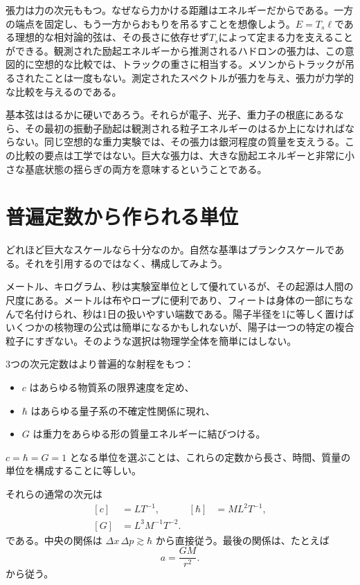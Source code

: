 張力は力の次元ももつ。なぜなら力かける距離はエネルギーだからである。一方の端点を固定し、もう一方からおもりを吊るすことを想像しよう。\(E=T_s\ell\)である理想的な相対論的弦は、その長さに依存せず\(T_s\)によって定まる力を支えることができる。観測された励起エネルギーから推測されるハドロンの張力は、この意図的に空想的な比較では、トラックの重さに相当する。メソンからトラックが吊るされたことは一度もない。測定されたスペクトルが張力を与え、張力が力学的な比較を与えるのである。

基本弦ははるかに硬いであろう。それらが電子、光子、重力子の根底にあるなら、その最初の振動子励起は観測される粒子エネルギーのはるか上になければならない。同じ空想的な重力実験では、その張力は銀河程度の質量を支えうる。この比較の要点は工学ではない。巨大な張力は、大きな励起エネルギーと非常に小さな基底状態の揺らぎの両方を意味するということである。

\section{普遍定数から作られる単位}

どれほど巨大なスケールなら十分なのか。自然な基準はプランクスケールである。それを引用するのではなく、構成してみよう。

メートル、キログラム、秒は実験室単位として優れているが、その起源は人間の尺度にある。メートルは布やロープに便利であり、フィートは身体の一部にちなんで名付けられ、秒は1日の扱いやすい端数である。陽子半径を1に等しく置けばいくつかの核物理の公式は簡単になるかもしれないが、陽子は一つの特定の複合粒子にすぎない。そのような選択は物理学全体を簡単にはしない。

3つの次元定数はより普遍的な射程をもつ：
\begin{itemize}
  \item \(c\) はあらゆる物質系の限界速度を定め、
  \item \(\hbar\) はあらゆる量子系の不確定性関係に現れ、
  \item \(G\) は重力をあらゆる形の質量エネルギーに結びつける。
\end{itemize}
\(c=\hbar=G=1\) となる単位を選ぶことは、これらの定数から長さ、時間、質量の単位を構成することに等しい。

それらの通常の次元は
\begin{equation}
  \begin{aligned}
    [c]&=LT^{-1},
    & [\hbar]&=ML^2T^{-1},\\
    [G]&=L^3M^{-1}T^{-2}.
  \end{aligned}
  \label{eq:l05-dimensions-constants}
\end{equation}
である。中央の関係は
\(\Delta x\,\Delta p\gtrsim\hbar\)
から直接従う。最後の関係は、たとえば
\begin{equation}
  a=\frac{GM}{r^2}.
\end{equation}
から従う。

